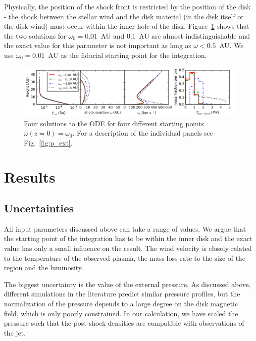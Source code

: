 \documentclass[manuscript]{aastex}
\begin{document}
Physically, the position of the shock front is restricted by the position of the disk - the shock between the stellar wind and the disk material (in the disk itself or the disk wind) must occur within the inner hole of the disk. Figure~\ref{fig:omega_0} shows that the two solutions for $\omega_0=0.01$~AU and $0.1$~AU are almost indistinguishable and the exact value for this parameter is not important as long as $\omega < 0.5$~AU. We use $\omega_0 = 0.01$~AU as the fiducial starting point for the integration.

\begin{figure}[h!]
\begin{center}
\includegraphics[width=1\columnwidth]{figures/omega_0/omega_0.png}
\caption{\label{fig:omega_0}
Four solutions to the ODE for four different starting points $\omega(z=0)=\omega_0$. For a description of the individual panels see Fig.~\ref{fig:p_ext}.}
\end{center}
\end{figure}

\section{Results}
\label{sect:results}

\subsection{Uncertainties}
All input parameters discussed above can take a range of values. We argue that the starting point of the integration has to be within the inner disk and the exact value has only a small influence on the result. The wind velocity is closely related to the temperature of the observed plasma, the mass loss rate to the size of the region and the luminosity.

The biggest uncertainty is the value of the external pressure. As discussed above, different simulations in the literature predict similar pressure profiles, but the normalization of the pressure depends to a large degree on the disk magnetic field, which is only poorly constrained. In our calculation, we have scaled the pressure such that the post-shock densities are compatible with observations of the jet.
\end{document}
